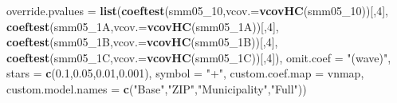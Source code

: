 \documentclass[
]{article}
\newenvironment{Shaded}{\begin{snugshade}}{\end{snugshade}}
\newcommand{\DataTypeTok}[1]{\textcolor[rgb]{0.13,0.29,0.53}{#1}}
\newcommand{\DecValTok}[1]{\textcolor[rgb]{0.00,0.00,0.81}{#1}}
\newcommand{\FloatTok}[1]{\textcolor[rgb]{0.00,0.00,0.81}{#1}}
\newcommand{\KeywordTok}[1]{\textcolor[rgb]{0.13,0.29,0.53}{\textbf{#1}}}
\newcommand{\NormalTok}[1]{#1}
\newcommand{\StringTok}[1]{\textcolor[rgb]{0.31,0.60,0.02}{#1}}
\begin{document}
\begin{Shaded}
\begin{Highlighting}[]
          \DataTypeTok{override.pvalues =} \KeywordTok{list}\NormalTok{(}\KeywordTok{coeftest}\NormalTok{(smm05_}\DecValTok{10}\NormalTok{,}\DataTypeTok{vcov.=}\KeywordTok{vcovHC}\NormalTok{(smm05_}\DecValTok{10}\NormalTok{))[,}\DecValTok{4}\NormalTok{],}
                                  \KeywordTok{coeftest}\NormalTok{(smm05_1A,}\DataTypeTok{vcov.=}\KeywordTok{vcovHC}\NormalTok{(smm05_1A))[,}\DecValTok{4}\NormalTok{],}
                                  \KeywordTok{coeftest}\NormalTok{(smm05_1B,}\DataTypeTok{vcov.=}\KeywordTok{vcovHC}\NormalTok{(smm05_1B))[,}\DecValTok{4}\NormalTok{],}
                                  \KeywordTok{coeftest}\NormalTok{(smm05_1C,}\DataTypeTok{vcov.=}\KeywordTok{vcovHC}\NormalTok{(smm05_1C))[,}\DecValTok{4}\NormalTok{]),}
          \DataTypeTok{omit.coef =} \StringTok{"(wave)"}\NormalTok{, }\DataTypeTok{stars =} \KeywordTok{c}\NormalTok{(}\FloatTok{0.1}\NormalTok{,}\FloatTok{0.05}\NormalTok{,}\FloatTok{0.01}\NormalTok{,}\FloatTok{0.001}\NormalTok{), }\DataTypeTok{symbol =} \StringTok{"+"}\NormalTok{,}
          \DataTypeTok{custom.coef.map =}\NormalTok{ vnmap, }
          \DataTypeTok{custom.model.names =} \KeywordTok{c}\NormalTok{(}\StringTok{"Base"}\NormalTok{,}\StringTok{"ZIP"}\NormalTok{,}\StringTok{"Municipality"}\NormalTok{,}\StringTok{"Full"}\NormalTok{))}
\end{Highlighting}
\end{Shaded}
\end{document}
